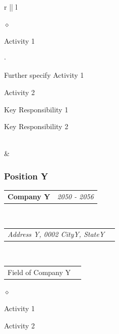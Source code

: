 \documentclass[a4paper]{article}
\makeatletter
\newlength{\sectsep}
\newlength{\subsectsep}
\newcommand{\headerrow}[2]
{\begin{tabular*}{\textwidth}{l@{\extracolsep{\fill}}r}
    #1 &
    #2 \\
\end{tabular*}}
\renewenvironment{itemize}{
  \begin{list}{$\diamond$}{
    \setlength{\topsep}{0.25em}
    \setlength{\itemsep}{0em}
    \setlength{\parskip}{0pt}
    \setlength{\parsep}{0em}
  }
}{
  \end{list}
}
\newenvironment{itemize2}{
  \begin{list}{$\cdot$}{
    \setlength{\topsep}{0.25em}
    \setlength{\itemsep}{0em}
    \setlength{\parskip}{0pt}
    \setlength{\parsep}{0em}
  }
}{
  \end{list}
}
\makeatother
\begin{document}
\begin{longtable}{r || l}
\begin{minipage}{0.9\textwidth}
      \begin{itemize}
          \item Activity 1
          \begin{itemize2}
              \item Further specify Activity 1
          \end{itemize2}
          \item Activity 2
          \item Key Responsibility 1
          \item Key Responsibility 2
      \end{itemize}
  \end{minipage} \\[\sectsep]

  & \begin{minipage}{0.9\textwidth}
      \vspace{\subsectsep}
      \subsubsection*{Position Y}
      \headerrow
        {\textbf{Company Y}}{\emph{2050 - 2056}}
      \\
      \headerrow
        {\emph{Address Y, 0002 CityY, StateY}}{}
      \\
      \headerrow
          {Field of Company Y}{}

      \begin{itemize}
          \item Activity 1
          \item Activity 2
      \end{itemize}
  \end{minipage} \\[\sectsep]



\end{longtable}
\end{document}
